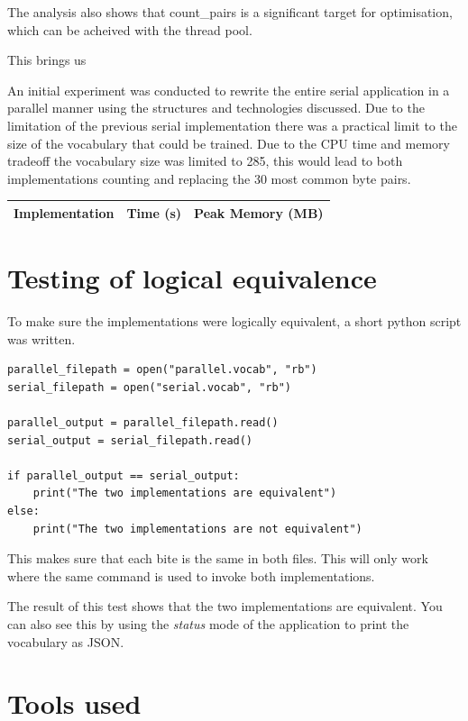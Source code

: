 \documentclass{article}
\begin{document}
The analysis also shows that count\_pairs is a significant target for optimisation, which can be 
acheived with the thread pool.

This brings us 


An initial experiment was conducted to rewrite the entire serial application in a parallel manner using 
the structures and technologies discussed. Due to the limitation of the previous serial implementation 
there was a practical limit to the size of the vocabulary that could be trained. Due to the CPU time 
and memory tradeoff the vocabulary size was limited to 285, this would lead to both implementations 
counting and replacing the 30 most common byte pairs.

\begin{table}[H]
    \centering
    \begin{tabular}{|c|c|c|}
        \hline
        \textbf{Implementation} & \textbf{Time (s)} & \textbf{Peak Memory (MB)} \\        
        \hline
    \end{tabular}
\end{table}

\section{Testing of logical equivalence}

To make sure the implementations were logically equivalent, a short python script was written.

\begin{verbatim}
parallel_filepath = open("parallel.vocab", "rb")
serial_filepath = open("serial.vocab", "rb")

parallel_output = parallel_filepath.read()
serial_output = serial_filepath.read()

if parallel_output == serial_output:
    print("The two implementations are equivalent")
else:
    print("The two implementations are not equivalent")
\end{verbatim}

This makes sure that each bite is the same in both files. This will only work where the same command 
is used to invoke both implementations.

The result of this test shows that the two implementations are equivalent. You can also see this by using 
the \textit{status} mode of the application to print the vocabulary as JSON.

\section{Tools used}
\end{document}
